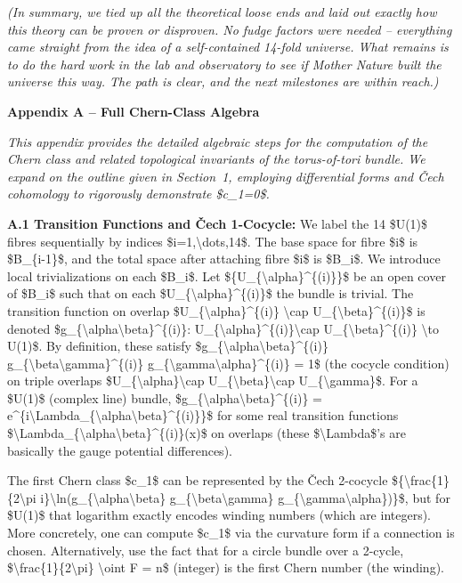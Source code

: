 \documentclass[]{article}
\begin{document}
\emph{(In summary, we tied up all the theoretical loose ends and laid
out exactly how this theory can be proven or disproven. No fudge factors
were needed -- everything came straight from the idea of a
self-contained 14-fold universe. What remains is to do the hard work in
the lab and observatory to see if Mother Nature built the universe this
way. The path is clear, and the next milestones are within reach.)}

\textbf{Appendix A -- Full Chern-Class Algebra}

\emph{This appendix provides the detailed algebraic steps for the
computation of the Chern class and related topological invariants of the
torus-of-tori bundle. We expand on the outline given in Section~1,
employing differential forms and Čech cohomology to rigorously
demonstrate \$c\_1=0\$.}

\textbf{A.1 Transition Functions and Čech 1-Cocycle:} We label the 14
\$U(1)\$ fibres sequentially by indices \$i=1,\textbackslash{}dots,14\$.
The base space for fibre \$i\$ is \$B\_\{i-1\}\$, and the total space
after attaching fibre \$i\$ is \$B\_i\$. We introduce local
trivializations on each \$B\_i\$. Let
\$\{U\_\{\textbackslash{}alpha\}\^{}\{(i)\}\}\$ be an open cover of
\$B\_i\$ such that on each \$U\_\{\textbackslash{}alpha\}\^{}\{(i)\}\$
the bundle is trivial. The transition function on overlap
\$U\_\{\textbackslash{}alpha\}\^{}\{(i)\} \textbackslash{}cap
U\_\{\textbackslash{}beta\}\^{}\{(i)\}\$ is denoted
\$g\_\{\textbackslash{}alpha\textbackslash{}beta\}\^{}\{(i)\}:
U\_\{\textbackslash{}alpha\}\^{}\{(i)\}\textbackslash{}cap
U\_\{\textbackslash{}beta\}\^{}\{(i)\} \textbackslash{}to U(1)\$. By
definition, these satisfy
\$g\_\{\textbackslash{}alpha\textbackslash{}beta\}\^{}\{(i)\}
g\_\{\textbackslash{}beta\textbackslash{}gamma\}\^{}\{(i)\}
g\_\{\textbackslash{}gamma\textbackslash{}alpha\}\^{}\{(i)\} = 1\$ (the
cocycle condition) on triple overlaps
\$U\_\{\textbackslash{}alpha\}\textbackslash{}cap
U\_\{\textbackslash{}beta\}\textbackslash{}cap
U\_\{\textbackslash{}gamma\}\$. For a \$U(1)\$ (complex line) bundle,
\$g\_\{\textbackslash{}alpha\textbackslash{}beta\}\^{}\{(i)\} =
e\^{}\{i\textbackslash{}Lambda\_\{\textbackslash{}alpha\textbackslash{}beta\}\^{}\{(i)\}\}\$
for some real transition functions
\$\textbackslash{}Lambda\_\{\textbackslash{}alpha\textbackslash{}beta\}\^{}\{(i)\}(x)\$
on overlaps (these \$\textbackslash{}Lambda\$'s are basically the gauge
potential differences).

The first Chern class \$c\_1\$ can be represented by the Čech 2-cocycle
\$\{\textbackslash{}frac\{1\}\{2\textbackslash{}pi
i\}\textbackslash{}ln(g\_\{\textbackslash{}alpha\textbackslash{}beta\}
g\_\{\textbackslash{}beta\textbackslash{}gamma\}
g\_\{\textbackslash{}gamma\textbackslash{}alpha\})\}\$, but for \$U(1)\$
that logarithm exactly encodes winding numbers (which are integers).
More concretely, one can compute \$c\_1\$ via the curvature form if a
connection is chosen. Alternatively, use the fact that for a circle
bundle over a 2-cycle,
\$\textbackslash{}frac\{1\}\{2\textbackslash{}pi\} \textbackslash{}oint
F = n\$ (integer) is the first Chern number (the winding).
\end{document}
